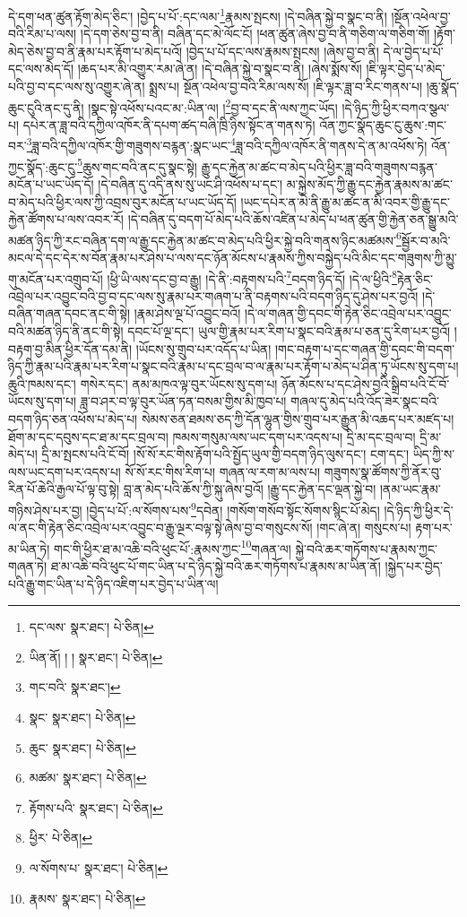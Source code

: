 དེ་དག་ཕན་ཚུན་རྟོག་མེད་ཅིང་། །བྱེད་པ་པོ་:དང་ལམ་\footnote{དང་ལས་  སྣར་ཐང་།  པེ་ཅིན། }རྣམས་སྤངས། །དེ་བཞིན་སྐྱེ་བ་སྣང་བ་ནི། །སྔོན་འཕེལ་བྱ་བའི་རིམ་པ་ལས། །དེ་དག་ཅེས་བྱ་བ་ནི། བཞིན་དང་མེ་ལོང་ངོ། །ཕན་ཚུན་ཞེས་བྱ་བ་ནི་གཅིག་ལ་གཅིག་གོ། །རྟོག་མེད་ཅེས་བྱ་བ་ནི་རྣམ་པར་རྟོག་པ་མེད་པའོ། །བྱེད་པ་པོ་དང་ལས་རྣམས་སྤངས། །ཞེས་བྱ་བ་ནི། དེ་ལ་བྱེད་པ་པོ་དང་ལས་མེད་དོ། །ཆད་པར་མི་འགྱུར་རམ་ཞེ་ན། །དེ་བཞིན་སྐྱེ་བ་སྣང་བ་ནི། །ཞེས་སྨོས་སོ། །ཇི་ལྟར་བྱེད་པ་མེད་པའི་བྱ་བ་དང་ལས་སུ་འགྱུར་ཞེ་ན། སྨྲས་པ། སྔོན་འཕེལ་བྱ་བའི་རིམ་ལས་སོ། །ཇི་ལྟར་ཟླ་བ་རིང་གནས་པ། །ཆུ་སྣོད་ཆུང་ངུའི་ནང་དུ་ནི། །སྣང་སྟེ་འཕོས་པའང་མ་:ཡིན་ལ། །\footnote{ཡིན་ནོ། ། །  སྣར་ཐང་།  པེ་ཅིན། }བྱ་བ་དང་ནི་ལས་ཀྱང་ཡོད། །དེ་ཉིད་ཀྱི་ཕྱིར་བཀའ་སྩལ་པ། དཔེར་ན་ཟླ་བའི་དཀྱིལ་འཁོར་ནི་དཔག་ཚད་བཞི་ཁྲི་ཉིས་སྟོང་ན་གནས་ཏེ། འོན་ཀྱང་སྣོད་ཆུང་ངུ་ཆུས་:གང་བར་\footnote{གང་བའི་  སྣར་ཐང་། }ཟླ་བའི་དཀྱིལ་འཁོར་གྱི་གཟུགས་བརྙན་:སྣང་ཡང་\footnote{སྣང་  སྣར་ཐང་།  པེ་ཅིན། }ཟླ་བའི་དཀྱིལ་འཁོར་ནི་གནས་དེ་ན་མ་འཕོས་ཏེ། འོན་ཀྱང་སྣོད་:ཆུང་ངུ་\footnote{ཆུང་  སྣར་ཐང་།  པེ་ཅིན། }ཆུས་གང་བའི་ནང་དུ་སྣང་སྟེ། རྒྱུ་དང་རྐྱེན་མ་ཚང་བ་མེད་པའི་ཕྱིར་ཟླ་བའི་གཟུགས་བརྙན་མངོན་པ་ཡང་ཡོད་དོ། །དེ་བཞིན་དུ་འདི་ནས་སུ་ཡང་ཤི་འཕོས་པ་དང་། མ་སྐྱེས་མོད་ཀྱི་རྒྱུ་དང་རྐྱེན་རྣམས་མ་ཚང་བ་མེད་པའི་ཕྱིར་ལས་ཀྱི་འབྲས་བུར་མངོན་པ་ཡང་ཡོད་དོ། །ཡང་དཔེར་ན་མེ་ནི་རྒྱུ་མ་ཚང་ན་མི་འབར་གྱི་རྒྱུ་དང་རྐྱེན་ཚོགས་པ་ལས་འབར་རོ། །དེ་བཞིན་དུ་བདག་པོ་མེད་པའི་ཆོས་འཛིན་པ་མེད་པ་ཕན་ཚུན་གྱི་རྐྱེན་ཅན་སྒྱུ་མའི་མཚན་ཉིད་ཀྱི་རང་བཞིན་དག་ལ་རྒྱུ་དང་རྐྱེན་མ་ཚང་བ་མེད་པའི་ཕྱིར་སྐྱེ་བའི་གནས་ཉིང་མཚམས་\footnote{མཚམ་  སྣར་ཐང་།  པེ་ཅིན། }སྦྱོར་བ་མའི་མངལ་དེ་དང་དེར་ས་བོན་རྣམ་པར་ཤེས་པ་ལས་དང་ཉོན་མོངས་པ་རྣམས་ཀྱིས་བསྐྱེད་པའི་མིང་དང་གཟུགས་ཀྱི་མྱུ་གུ་མངོན་པར་འགྲུབ་པོ། །ཕྱི་ཡི་ལས་དང་བྱ་བ་རྒྱུ། །དེ་ནི་:བརྟགས་པའི་\footnote{རྟོགས་པའི་  སྣར་ཐང་།  པེ་ཅིན། }བདག་ཉིད་དོ། །དེ་ལ་ཕྱིའི་\footnote{ཕྱིར་  པེ་ཅིན། }རྟེན་ཅིང་འབྲེལ་པར་འབྱུང་བའི་བྱ་བ་དང་ལས་སུ་རྣམ་པར་གཞག་པ་ནི་བརྟགས་པའི་བདག་ཉིད་དུ་ཤེས་པར་བྱའོ། །དེ་བཞིན་གཞན་དབང་ནང་གི་སྟེ། །རྣམ་ཤེས་ལྔ་པོ་འབྱུང་བའོ། །དེ་ལ་གཞན་གྱི་དབང་གི་རྟེན་ཅིང་འབྲེལ་པར་འབྱུང་བའི་མཚན་ཉིད་ནི་ནང་གི་སྟེ། དབང་པོ་ལྔ་དང་། ཡུལ་གྱི་རྣམ་པར་རིག་པ་སྣང་བའི་རྣམ་པ་ཅན་དུ་རིག་པར་བྱའོ། །བརྟག་བྱ་མིན་ཕྱིར་དོན་དམ་ནི། །ཡོངས་སུ་གྲུབ་པར་འདོད་པ་ཡིན། །གང་བརྟག་པ་དང་གཞན་གྱི་དབང་གི་བདག་ཉིད་ཀྱི་རྣམ་པའི་རྣམ་པར་རིག་པ་སྣང་བའི་རྣམ་པ་དང་བྲལ་བ་ལ་རྣམ་པར་རྟོག་པ་མེད་པ་ཤིན་ཏུ་ཡོངས་སུ་དག་པ། ཆུའི་ཁམས་དང་། གསེར་དང་། ནམ་མཁའ་ལྟ་བུར་ཡོངས་སུ་དག་པ། ཉོན་མོངས་པ་དང་ཤེས་བྱའི་སྒྲིབ་པའི་ངོ་བོ་ཡོངས་སུ་དག་པ། ཟླ་བ་ཤར་བ་ལྟ་བུར་ཡོན་ཏན་བསམ་གྱིས་མི་ཁྱབ་པ། གཞལ་དུ་མེད་པའི་འོད་ཟེར་སྣང་བའི་བདག་ཉིད་ཅན་འཕོས་པ་མེད་པ། སེམས་ཅན་ཐམས་ཅད་ཀྱི་དོན་ལྷུན་གྱིས་གྲུབ་པར་རྒྱུན་མི་འཆད་པར་མཛད་པ། ཐོག་མ་དང་དབུས་དང་ཐ་མ་དང་བྲལ་བ། ཁམས་གསུམ་ལས་ཡང་དག་པར་འདས་པ། དྲི་མ་དང་བྲལ་བ། དྲི་མ་མེད་པ། དྲི་མ་སྤངས་པའི་ངོ་བོ། །སོ་སོ་རང་གིས་རྟོག་པའི་སྤྱོད་ཡུལ་གྱི་བདག་ཉིད་ལུས་དང་། ངག་དང་། ཡིད་ཀྱི་ས་ལས་ཡང་དག་པར་འདས་པ། སོ་སོ་རང་གིས་རིག་པ། གཞན་ལ་རག་མ་ལས་པ། གཟུགས་སྣ་ཚོགས་ཀྱི་ནོར་བུ་རིན་པོ་ཆེའི་རྒྱལ་པོ་ལྟ་བུ་སྟེ། བླ་ན་མེད་པའི་ཆོས་ཀྱི་སྐུ་ཞེས་བྱའོ། །རྒྱུ་དང་རྐྱེན་དང་ལྡན་སྐྱེ་བ། །ནམ་ཡང་རྣམ་གཉིས་ཤེས་པར་བྱ། །བྱེད་པ་པོ་:ལ་སོགས་པས་\footnote{ལ་སོགས་པ་  སྣར་ཐང་།  པེ་ཅིན། }དབེན། །གསོག་གསོབ་སྟོང་སོགས་སྙིང་པོ་མེད། །དེ་ཉིད་ཀྱི་ཕྱིར་དེ་ལ་ནང་གི་རྟེན་ཅིང་འབྲེལ་པར་འབྱུང་བ་རྒྱུ་ལྔར་བལྟ་སྟེ་ཞེས་བྱ་བ་གསུངས་སོ། །གང་ཞེ་ན། གསུངས་པ། རྟག་པར་མ་ཡིན་ཏེ། གང་གི་ཕྱིར་ཐ་མ་འཆི་བའི་ཕུང་པོ་:རྣམས་ཀྱང་\footnote{རྣམས་  སྣར་ཐང་།  པེ་ཅིན། }གཞན་ལ། སྐྱེ་བའི་ཆར་གཏོགས་པ་རྣམས་ཀྱང་གཞན་ཏེ། ཐ་མ་འཆི་བའི་ཕུང་པོ་གང་ཡིན་པ་དེ་ཉིད་སྐྱེ་བའི་ཆར་གཏོགས་པ་རྣམས་མ་ཡིན་ནོ། །སྐྱེད་པར་བྱེད་པའི་རྒྱུ་གང་ཡིན་པ་དེ་ཉིད་འཇིག་པར་བྱེད་པ་ཡིན་ལ། 